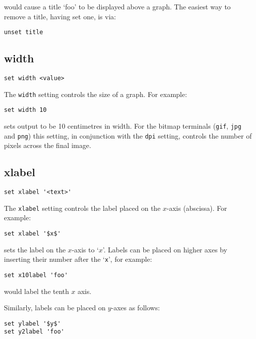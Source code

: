 \noindent would cause a title `foo' to be displayed above a graph. The easiest
way to remove a title, having set one, is via:

\begin{verbatim}
unset title
\end{verbatim}
   
\subsection{width}

\begin{verbatim}
set width <value>
\end{verbatim}

The {\tt width} setting controls the size of a graph.  For example:

\begin{verbatim}
set width 10
\end{verbatim}

\noindent sets output to be 10 centimetres in width.  For the bitmap terminals ({\tt gif},
{\tt jpg} and {\tt png}) this setting, in conjunction with the {\tt dpi}
setting, controls the number of pixels across the final image.

\subsection{xlabel}

\begin{verbatim}
set xlabel '<text>'
\end{verbatim}

The {\tt xlabel} setting controls the label placed on the $x$-axis (abscissa).
For example:

\begin{verbatim}
set xlabel '$x$'
\end{verbatim}

\noindent sets the label on the $x$-axis to `$x$'.  Labels can be placed on higher axes by
inserting their number after the `{\tt x}', for example:

\begin{verbatim}
set x10label 'foo'
\end{verbatim}

\noindent would label the tenth $x$ axis.

Similarly, labels can be placed on $y$-axes as follows:

\begin{verbatim}
set ylabel '$y$' 
set y2label 'foo'
\end{verbatim}


